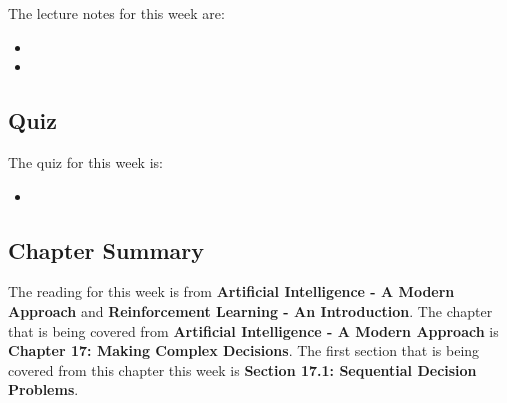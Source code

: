 \noindent The lecture notes for this week are:

\begin{itemize}
    \item {}
    \item {}
\end{itemize}

\subsection{Quiz}

The quiz for this week is:

\begin{itemize}
    \item {}
\end{itemize}

\newpage

\subsection{Chapter Summary}

The reading for this week is from \textbf{Artificial Intelligence - A Modern Approach} and \textbf{Reinforcement Learning - An Introduction}. The chapter that is being covered from \textbf{Artificial Intelligence - A Modern Approach}
is \textbf{Chapter 17: Making Complex Decisions}. The first section that is being covered from this chapter this week is \textbf{Section 17.1: Sequential Decision Problems}.

